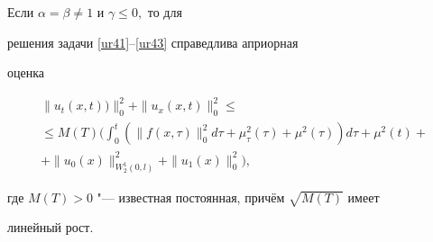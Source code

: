 \begin{theorem}[5]Если $\alpha=\beta\neq1$ и $\gamma\leq0,$ то для

решения задачи \eqref{ur41}--\eqref{ur43} справедлива априорная

оценка

\begin{multline}

\|u_t(x,t))\|_0^2+\|u_x(x,t)\|_0^2\leq

\\

\leq

M(T)\biggl(\int_{0}^{t}(\|f(x,\tau)\|_0^2d\tau+\mu_{\tau}^2(\tau)+\mu^2(\tau))d\tau+\mu^2(t)+

\\

+\|u_0(x)\|_{W_2^1(0,l)}^2+\|u_1(x)\|_0^2\biggr),

\label{ur44}

\end{multline}

где $M(T)>0$ "--- известная постоянная{\rm ,} причём $\sqrt{M(T)}$ имеет

линейный рост{\rm .}

\end{theorem}



